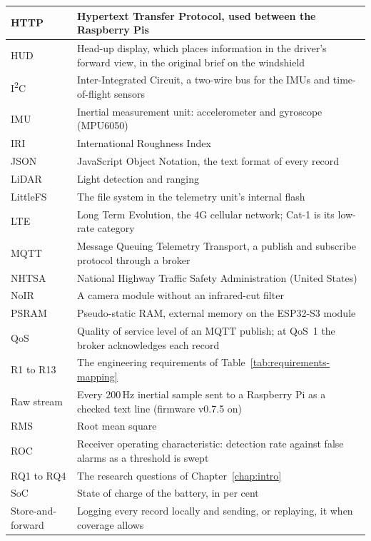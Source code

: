 \documentclass[a4paper,11pt]{report}
\begin{document}
{{\begin{longtable}{|>{\raggedright\arraybackslash}p{2.6cm}|>{\raggedright\arraybackslash}p{11.2cm}|}
HTTP & Hypertext Transfer Protocol, used between the Raspberry Pis \\ \hline
HUD & Head-up display, which places information in the driver's forward view, in the original brief on the windshield \\ \hline
I\textsuperscript{2}C & Inter-Integrated Circuit, a two-wire bus for the IMUs and time-of-flight sensors \\ \hline
IMU & Inertial measurement unit: accelerometer and gyroscope (MPU6050) \\ \hline
IRI & International Roughness Index \\ \hline
JSON & JavaScript Object Notation, the text format of every record \\ \hline
LiDAR & Light detection and ranging \\ \hline
LittleFS & The file system in the telemetry unit's internal flash \\ \hline
LTE & Long Term Evolution, the 4G cellular network; Cat-1 is its low-rate category \\ \hline
MQTT & Message Queuing Telemetry Transport, a publish and subscribe protocol through a broker \\ \hline
NHTSA & National Highway Traffic Safety Administration (United States) \\ \hline
NoIR & A camera module without an infrared-cut filter \\ \hline
PSRAM & Pseudo-static RAM, external memory on the ESP32-S3 module \\ \hline
QoS & Quality of service level of an MQTT publish; at QoS~1 the broker acknowledges each record \\ \hline
R1 to R13 & The engineering requirements of Table~\ref{tab:requirements-mapping} \\ \hline
Raw stream & Every 200\,Hz inertial sample sent to a Raspberry Pi as a checked text line (firmware v0.7.5 on) \\ \hline
RMS & Root mean square \\ \hline
ROC & Receiver operating characteristic: detection rate against false alarms as a threshold is swept \\ \hline
RQ1 to RQ4 & The research questions of Chapter~\ref{chap:intro} \\ \hline
SoC & State of charge of the battery, in per cent \\ \hline
Store-and-forward & Logging every record locally and sending, or replaying, it when coverage allows \\ \hline

\end{longtable}}}
\end{document}
